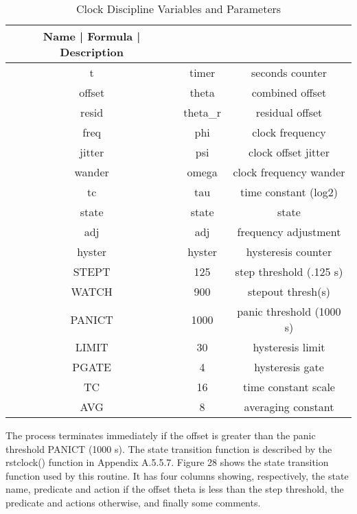 \begin{table}[htb]
\center
\begin{tabular}{c | c | c}
Name   | Formula    | Description              \\
\hline
\hline
t      & timer      & seconds counter          \\
offset & theta      & combined offset          \\
resid  & theta\_r   & residual offset          \\
freq   & phi        & clock frequency          \\
jitter & psi        & clock offset jitter      \\
wander & omega      & clock frequency wander   \\
tc     & tau        & time constant (log2)     \\
state  & state      & state                    \\
adj    & adj        & frequency adjustment     \\
hyster & hyster     & hysteresis counter       \\
STEPT  & 125        & step threshold (.125 s)  \\
WATCH  & 900        & stepout thresh(s)        \\
PANICT & 1000       & panic threshold (1000 s) \\
LIMIT  & 30         & hysteresis limit         \\
PGATE  & 4          & hysteresis gate          \\
TC     & 16         & time constant scale      \\
AVG    & 8          & averaging constant       \\
\hline
\end{tabular}
\label{clock_discipline_variables_and_parameters}
\caption{Clock Discipline Variables and Parameters}
\end{table} 

The process terminates immediately if the offset is greater than the
panic threshold PANICT (1000 s).  The state transition function is
described by the rstclock() function in Appendix A.5.5.7.  Figure 28
shows the state transition function used by this routine.  It has
four columns showing, respectively, the state name, predicate and
action if the offset theta is less than the step threshold, the
predicate and actions otherwise, and finally some comments.

